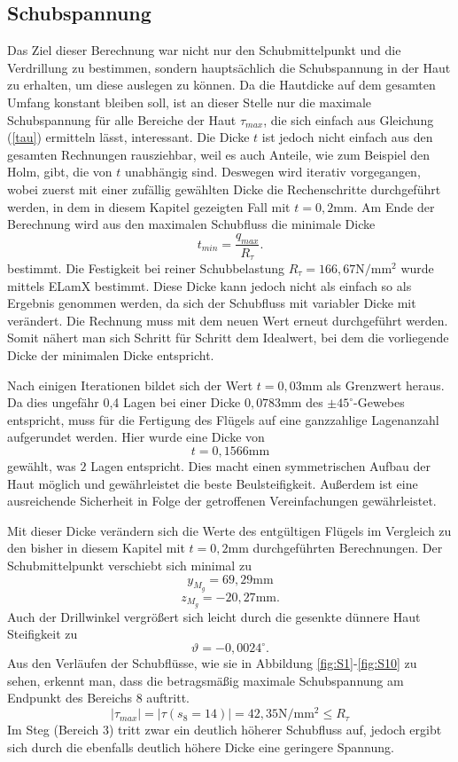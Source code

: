 \subsection{Schubspannung}
Das Ziel dieser Berechnung war nicht nur den Schubmittelpunkt und die Verdrillung zu bestimmen, sondern hauptsächlich die Schubspannung in der Haut zu erhalten, um diese auslegen zu können. Da die Hautdicke auf dem gesamten Umfang konstant bleiben soll, ist an dieser Stelle nur die maximale Schubspannung für alle Bereiche der Haut $\tau_{max}$, die sich einfach aus Gleichung (\ref{tau}) ermitteln lässt, interessant. Die Dicke $t$ ist jedoch nicht einfach aus den gesamten Rechnungen rausziehbar, weil es auch Anteile, wie zum Beispiel den Holm, gibt, die von $t$ unabhängig sind. Deswegen wird iterativ vorgegangen, wobei zuerst mit einer zufällig gewählten Dicke die Rechenschritte durchgeführt werden, in dem in diesem Kapitel gezeigten Fall mit $t=0,2\mathrm{mm}$. Am Ende der Berechnung wird aus den maximalen Schubfluss die minimale Dicke
\begin{equation}
	t_{min} = \frac{q_{max}}{R_{\tau}}.
\end{equation} 
bestimmt. Die Festigkeit bei reiner Schubbelastung $R_{\tau} = 166,67\mathrm{N/mm^2}$ wurde mittels ELamX bestimmt. Diese Dicke kann jedoch nicht als einfach so als Ergebnis genommen werden, da sich der Schubfluss mit variabler Dicke mit verändert. Die Rechnung muss mit dem neuen Wert erneut durchgeführt werden. Somit nähert man sich Schritt für Schritt dem Idealwert, bei dem die vorliegende Dicke der minimalen Dicke entspricht.

Nach einigen Iterationen bildet sich der Wert $t = 0,03\mathrm{mm}$ als Grenzwert heraus. Da dies ungefähr 0,4 Lagen bei einer Dicke $0,0783\mathrm{mm}$ des $\pm45^\circ$-Gewebes entspricht, muss für die Fertigung des Flügels auf eine ganzzahlige Lagenanzahl aufgerundet werden. Hier wurde eine Dicke von 
\begin{equation}
	t = 0,1566 \mathrm{mm}
\end{equation}
gewählt, was $2$ Lagen entspricht. Dies macht einen symmetrischen Aufbau der Haut möglich und gewährleistet die beste Beulsteifigkeit. Außerdem ist eine ausreichende Sicherheit in Folge der getroffenen Vereinfachungen gewährleistet.

Mit dieser Dicke verändern sich die Werte des entgültigen Flügels im Vergleich zu den bisher in diesem Kapitel mit $t=0,2\mathrm{mm}$ durchgeführten Berechnungen. Der Schubmittelpunkt verschiebt sich minimal zu
$$
	y_{M_{g}}=69,29\mathrm{mm}
$$
$$
	z_{M_{g}}=-20,27\mathrm{mm}.
$$
Auch der Drillwinkel vergrößert sich leicht durch die gesenkte dünnere Haut Steifigkeit zu
$$
	\vartheta =-0,0024 ^\circ.
$$
Aus den Verläufen der Schubflüsse, wie sie in Abbildung \ref{fig:S1}-\ref{fig:S10} zu sehen, erkennt man, dass die betragsmäßig maximale Schubspannung am Endpunkt des Bereichs 8 auftritt.
$$
	|\tau_{max}|=|\tau(s_8=14)|=42,35\mathrm{N/mm^2}\leq R_{\tau}
$$
Im Steg (Bereich 3) tritt zwar ein deutlich höherer Schubfluss auf, jedoch ergibt sich durch die ebenfalls deutlich höhere Dicke eine geringere Spannung.







